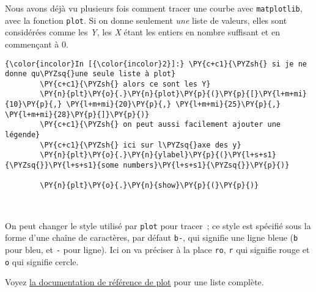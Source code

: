     Nous avons déjà vu plusieurs fois comment tracer une courbe avec
\texttt{matplotlib}, avec la fonction \texttt{plot}. Si on donne
seulement \emph{une} liste de valeurs, elles sont considérées comme les
\emph{Y}, les \emph{X} étant les entiers en nombre suffisant et en
commençant à 0.

    \begin{Verbatim}[commandchars=\\\{\},frame=single,framerule=0.3mm,rulecolor=\color{cellframecolor}]
{\color{incolor}In [{\color{incolor}2}]:} \PY{c+c1}{\PYZsh{} si je ne donne qu\PYZsq{}une seule liste à plot}
        \PY{c+c1}{\PYZsh{} alors ce sont les Y}
        \PY{n}{plt}\PY{o}{.}\PY{n}{plot}\PY{p}{(}\PY{p}{[}\PY{l+m+mi}{10}\PY{p}{,} \PY{l+m+mi}{20}\PY{p}{,} \PY{l+m+mi}{25}\PY{p}{,} \PY{l+m+mi}{28}\PY{p}{]}\PY{p}{)}
        \PY{c+c1}{\PYZsh{} on peut aussi facilement ajouter une légende}
        \PY{c+c1}{\PYZsh{} ici sur l\PYZsq{}axe des y}
        \PY{n}{plt}\PY{o}{.}\PY{n}{ylabel}\PY{p}{(}\PY{l+s+s1}{\PYZsq{}}\PY{l+s+s1}{some numbers}\PY{l+s+s1}{\PYZsq{}}\PY{p}{)}
        
        \PY{n}{plt}\PY{o}{.}\PY{n}{show}\PY{p}{(}\PY{p}{)}
\end{Verbatim}


    \begin{center}
    \end{center}
    { \hspace*{\fill} \\}
    
    On peut changer le style utilisé par \texttt{plot} pour tracer~; ce
style est spécifié sous la forme d'une chaîne de caractères, par défaut
\texttt{\textquotesingle{}b-\textquotesingle{}}, qui signifie une ligne
bleue (\texttt{b} pour bleu, et \texttt{-} pour ligne). Ici on va
préciser à la place \texttt{ro}, \texttt{r} qui signifie rouge et
\texttt{o} qui signifie cercle.

Voyez
\href{https://matplotlib.org/2.0.2/api/pyplot_api.html\#matplotlib.pyplot.plot}{la
documentation de référence de plot} pour une liste complète.


